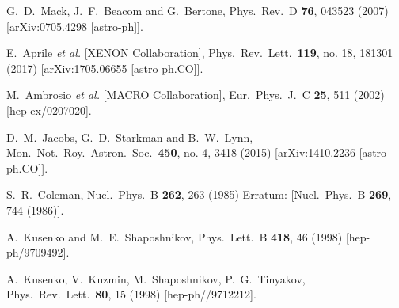   G.~D.~Mack, J.~F.~Beacom and G.~Bertone,
  Phys.\ Rev.\ D {\bf 76}, 043523 (2007)
  [arXiv:0705.4298 [astro-ph]].


  E.~Aprile {\it et al.} [XENON Collaboration],
  Phys.\ Rev.\ Lett.\  {\bf 119}, no. 18, 181301 (2017)
  [arXiv:1705.06655 [astro-ph.CO]].


  M.~Ambrosio {\it et al.} [MACRO Collaboration],
  Eur.\ Phys.\ J.\ C {\bf 25}, 511 (2002)
  [hep-ex/0207020].


  D.~M.~Jacobs, G.~D.~Starkman and B.~W.~Lynn,
  Mon.\ Not.\ Roy.\ Astron.\ Soc.\  {\bf 450}, no. 4, 3418 (2015)
  [arXiv:1410.2236 [astro-ph.CO]].


  S.~R.~Coleman,
  Nucl.\ Phys.\ B {\bf 262}, 263 (1985)
  Erratum: [Nucl.\ Phys.\ B {\bf 269}, 744 (1986)].


  A.~Kusenko and M.~E.~Shaposhnikov,
  Phys.\ Lett.\ B {\bf 418}, 46 (1998)
  [hep-ph/9709492].


  A.~Kusenko, V.~Kuzmin, M.~Shaposhnikov, P.~G.~Tinyakov,
  Phys.\ Rev.\ Lett.\ {\bf 80}, 15 (1998)
  [hep-ph//9712212].

